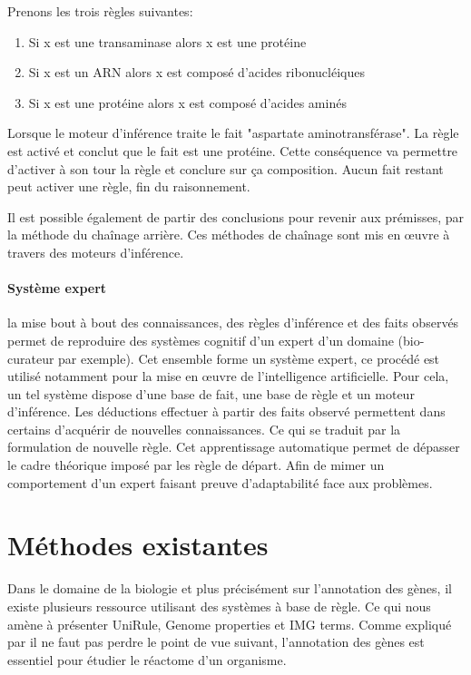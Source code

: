 \begin{refsegment}
    Prenons les trois règles suivantes:\nolisttopbreak    
    \begin{enumerate}
        \item Si x est une transaminase alors x est une protéine
        \item Si x est un ARN alors x est composé d'acides ribonucléiques
        \item Si x est une protéine alors x est composé d'acides aminés
    \end{enumerate}

    Lorsque le moteur d'inférence traite le fait "aspartate aminotransférase". La règle  est activé et  conclut que le fait est une protéine. Cette conséquence va permettre d'activer à son tour la règle  et conclure sur ça composition. Aucun fait restant peut activer une règle, fin du raisonnement.
    
    Il est possible également de partir des conclusions pour revenir aux prémisses, par la méthode du chaînage arrière. Ces méthodes de chaînage sont mis en œuvre à travers des moteurs d'inférence.
    
    \paragraph{Système expert} la mise bout à bout des connaissances, des règles d'inférence et des faits observés permet de reproduire des systèmes cognitif d'un expert d'un domaine (bio-curateur par exemple). Cet ensemble forme un système expert, ce procédé est utilisé notamment pour la mise en œuvre de l'intelligence artificielle. Pour cela, un tel système dispose d'une base de fait, une base de règle et un moteur d'inférence. Les déductions effectuer à partir des faits observé permettent dans certains d'acquérir de nouvelles connaissances. Ce qui se traduit par la formulation de nouvelle règle. Cet apprentissage automatique permet de dépasser le cadre théorique imposé par les règle de départ. Afin de mimer un comportement d'un expert faisant preuve d'adaptabilité face aux problèmes.
    
    \section{Méthodes existantes}
    
    Dans le domaine de la biologie et plus précisément sur l'annotation des gènes, il existe plusieurs ressource utilisant des systèmes à base de règle. Ce qui nous amène à présenter UniRule, Genome properties et IMG terms. Comme expliqué par \citeauthor{dale2010machine}\cite{dale2010machine} il ne faut pas perdre le point de vue suivant, l'annotation des gènes est essentiel pour étudier le réactome d'un organisme.
    

\end{refsegment}
